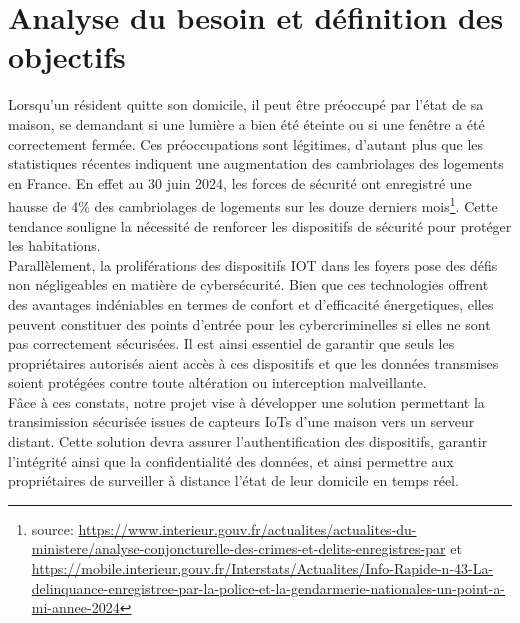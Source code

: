 \documentclass[10pt, a4paper]{report}
\begin{document}
	\section{Analyse du besoin et définition des objectifs}
		Lorsqu'un résident quitte son domicile, il peut être préoccupé par l'état de sa maison, se demandant si une lumière a bien été éteinte ou si une fenêtre a été correctement fermée. Ces préoccupations sont légitimes, d'autant plus que les statistiques récentes indiquent une augmentation des cambriolages des logements en France. En effet au 30 juin 2024, les forces de sécurité ont enregistré une hausse de 4\% des cambriolages de logements sur les douze derniers mois\footnote{source: \url{https://www.interieur.gouv.fr/actualites/actualites-du-ministere/analyse-conjoncturelle-des-crimes-et-delits-enregistres-par} et \url{https://mobile.interieur.gouv.fr/Interstats/Actualites/Info-Rapide-n-43-La-delinquance-enregistree-par-la-police-et-la-gendarmerie-nationales-un-point-a-mi-annee-2024}}. Cette tendance souligne la nécessité de renforcer les dispositifs de sécurité pour protéger les habitations.\\
		Parallèlement, la proliférations des dispositifs IOT dans les foyers pose des défis non négligeables en matière de cybersécurité. Bien que ces technologies offrent des avantages indéniables en termes de confort et d'efficacité énergetiques, elles peuvent constituer des points d'entrée pour les cybercriminelles si elles ne sont pas correctement sécurisées. Il est ainsi essentiel de garantir que seuls les propriétaires autorisés aient accès à ces dispositifs et que les données transmises soient protégées contre toute altération ou interception malveillante.\\
		Fâce à ces constats, notre projet vise à développer une solution permettant la transimission sécurisée issues de capteurs IoTs d'une maison vers un serveur distant. Cette solution devra assurer l'authentification des dispositifs, garantir l'intégrité ainsi que la confidentialité des données, et ainsi permettre aux propriétaires de surveiller à distance l'état de leur domicile en temps réel.
\end{document}
